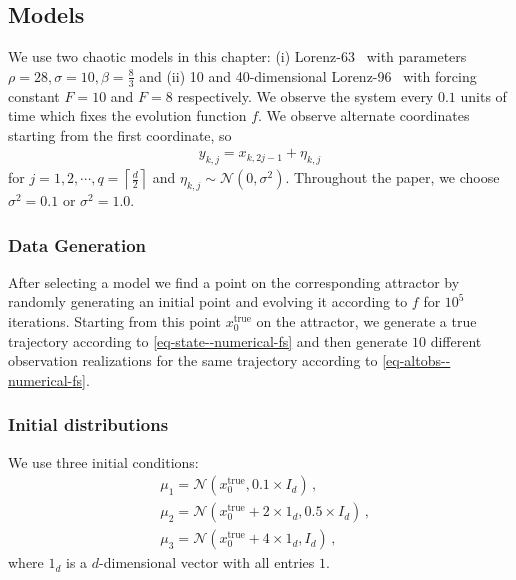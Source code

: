 \subsection{Models} \label{ssec-models--numerical-fs}
We use two chaotic models in this chapter: (i) Lorenz-63~\cite[Chapter~14]{hirsch2012differential} with parameters $\rho = 28, \sigma = 10, \beta = \frac{8}{3}$ and (ii) 10 and 40-dimensional Lorenz-96~\cite{Lorenz96, kekem2018dynamics} with forcing constant $F=10$ and $F=8$ respectively. We observe the system every $0.1$ units of time which fixes the evolution function $f$. We observe alternate coordinates starting from the first coordinate, so
\begin{align}
    y_{k,j} = x_{k,2j-1} + \eta_{k,j}
\label{eq-altobs--numerical-fs} \end{align}
for $j=1, 2, \cdots, q = \left\lceil\frac{d}{2}\right\rceil$ and $\eta_{k, j}\sim\mathcal N(0, \sigma^2)$. Throughout the paper, we choose $\sigma^2=0.1$ or $\sigma^2 = 1.0$.
\subsubsection{Data Generation}
After selecting a model we find a point on the corresponding attractor by randomly generating an initial point and evolving it according to $f$ for $10^5$ iterations. Starting from this point $x_0^{\text{true}}$ on the attractor, we generate a true trajectory according to \eqref{eq-state--numerical-fs} and then generate $10$ different observation realizations for the same trajectory according to \eqref{eq-altobs--numerical-fs}. 
\subsubsection{Initial distributions}\label{ssec-init-dist--numerical-fs}
We use three initial conditions:
\begin{align}
    &\mu_1 = \mathcal{N}(x_0^{\text{true}}, 0.1\times I_d) \,, \nonumber \\
    &\mu_2 = \mathcal{N}(x_0^{\text{true}} + 2\times1_d, 0.5\times I_d) \,, \nonumber \\
    &\mu_3 = \mathcal{N}(x_0^{\text{true}} + 4\times1_d, I_d) \,,
\label{eq-3ic--numerical-fs} \end{align}
where $1_d$ is a $d$-dimensional vector with all entries $1$.
